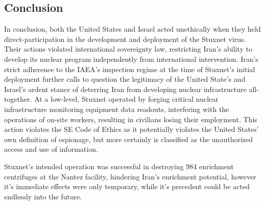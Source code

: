 \documentclass[12pt]{article}
\begin{document}
\begin{multicols}{2}
\section{Conclusion}

In conclusion, both the United States and Israel acted unethically when they held direct-participation in the development and deployment of the Stuxnet virus. Their actions violated international sovereignty law, restricting Iran's ability to develop its nuclear program independently from international intervention. Iran's strict adherence to the IAEA's inspection regime at the time of Stuxnet's initial deployment further calls to question the legitimacy of the United State's and Israel's ardent stance of deterring Iran from developing nuclear infrastructure all-together. At a low-level, Stuxnet operated by forging critical nuclear infrastructure monitoring equipment data readouts, interfering with the operations of on-site workers, resulting in civilians losing their employment. This action violates the SE Code of Ethics as it potentially violates the United States' own definition of espionage, but more certainly is classified as the unauthorized access and use of information.

Stuxnet's intended operation was successful in destroying 984 enrichment centrifuges at the Nantez facility, hindering Iran's enrichment potential, however it's immediate effects were only temporary, while it's precedent could be acted endlessly into the future.
 

\end{multicols}




\newpage

\end{document}
